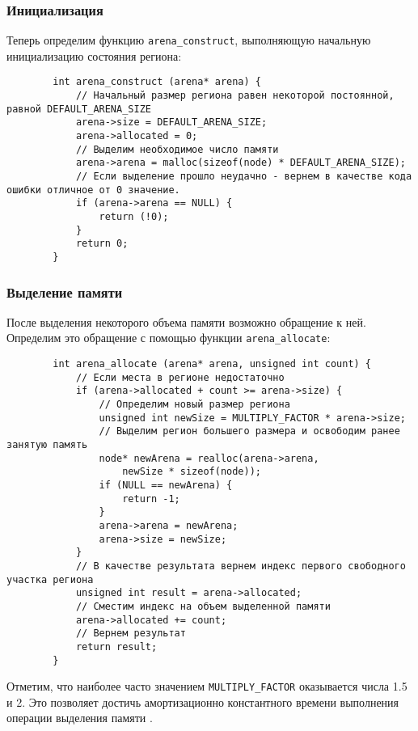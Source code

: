 \documentclass[bachelor, och, coursework]{SCWorks}
\begin{document}
    \subsubsection{Инициализация}
    Теперь определим функцию \verb"arena_construct", выполняющую начальную инициализацию состояния региона:
    \begin{verbatim}
        int arena_construct (arena* arena) {
            // Начальный размер региона равен некоторой постоянной, равной DEFAULT_ARENA_SIZE
            arena->size = DEFAULT_ARENA_SIZE;
            arena->allocated = 0;
            // Выделим необходимое число памяти
            arena->arena = malloc(sizeof(node) * DEFAULT_ARENA_SIZE);
            // Если выделение прошло неудачно - вернем в качестве кода ошибки отличное от 0 значение.
            if (arena->arena == NULL) {
                return (!0);
            }
            return 0;
        }
    \end{verbatim}

    \subsubsection{Выделение памяти}
    После выделения некоторого объема памяти возможно обращение к ней.
    Определим это обращение с помощью функции \verb"arena_allocate":
    \begin{verbatim}
        int arena_allocate (arena* arena, unsigned int count) {
            // Если места в регионе недостаточно
            if (arena->allocated + count >= arena->size) {
                // Определим новый размер региона
                unsigned int newSize = MULTIPLY_FACTOR * arena->size;
                // Выделим регион большего размера и освободим ранее занятую память
                node* newArena = realloc(arena->arena,
                    newSize * sizeof(node));
                if (NULL == newArena) {
                    return -1;
                }
                arena->arena = newArena;
                arena->size = newSize;
            }
            // В качестве результата вернем индекс первого свободного участка региона
            unsigned int result = arena->allocated;
            // Сместим индекс на объем выделенной памяти
            arena->allocated += count;
            // Вернем результат
            return result;
        }
    \end{verbatim}

    Отметим, что наиболее часто значением \verb"MULTIPLY_FACTOR" оказывается числа 
    1.5 и 2. Это позволяет достичь амортизационно константного времени 
    выполнения операции выделения памяти \cite{Facebook}.
\end{document}
